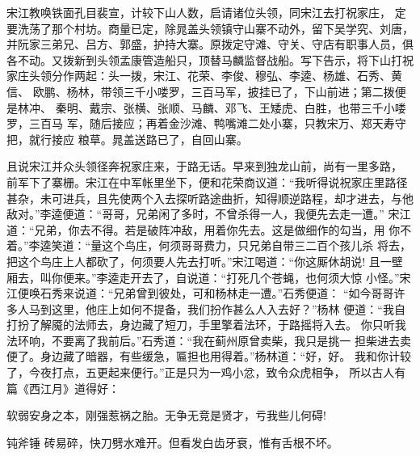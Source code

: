 宋江教唤铁面孔目裴宣，计较下山人数，启请诸位头领，同宋江去打祝家庄，
定要洗荡了那个村坊。商量已定，除晁盖头领镇守山寨不动外，留下吴学究、刘唐，
并阮家三弟兄、吕方、郭盛，护持大寨。原拨定守滩、守关、守店有职事人员，俱
各不动。又拨新到头领孟康管造船只，顶替马麟监督战船。写下告示，将下山打祝
家庄头领分作两起：头一拨，宋江、花荣、李俊、穆弘、李逵、杨雄、石秀、黄信、
欧鹏、杨林，带领三千小喽罗，三百马军，披挂已了，下山前进；第二拨便是林冲、
秦明、戴宗、张横、张顺、马麟、邓飞、王矮虎、白胜，也带三千小喽罗，三百马
军，随后接应；再着金沙滩、鸭嘴滩二处小寨，只教宋万、郑天寿守把，就行接应
粮草。晁盖送路已了，自回山寨。

且说宋江并众头领径奔祝家庄来，于路无话。早来到独龙山前，尚有一里多路，
前军下了寨栅。宋江在中军帐里坐下，便和花荣商议道：“我听得说祝家庄里路径
甚杂，未可进兵，且先使两个入去探听路途曲折，知得顺逆路程，却才进去，与他
敌对。”李逵便道：“哥哥，兄弟闲了多时，不曾杀得一人，我便先去走一遭。”
宋江道：“兄弟，你去不得。若是破阵冲敌，用着你先去。这是做细作的勾当，用
你不着。”李逵笑道：“量这个鸟庄，何须哥哥费力，只兄弟自带三二百个孩儿杀
将去，把这个鸟庄上人都砍了，何须要人先去打听。”宋江喝道：“你这厮休胡说!
且一壁厢去，叫你便来。”李逵走开去了，自说道：“打死几个苍蝇，也何须大惊
小怪。”宋江便唤石秀来说道：“兄弟曾到彼处，可和杨林走一遭。”石秀便道：
“如今哥哥许多人马到这里，他庄上如何不提备，我们扮作甚么人入去好？”杨林
便道：“我自打扮了解魇的法师去，身边藏了短刀，手里擎着法环，于路摇将入去。
你只听我法环响，不要离了我前后。”石秀道：“我在蓟州原曾卖柴，我只是挑一
担柴进去卖便了。身边藏了暗器，有些缓急，匾担也用得着。”杨林道：“好，好。
我和你计较了，今夜打点，五更起来便行。”正是只为一鸡小忿，致令众虎相争，
所以古人有篇《西江月》道得好：

软弱安身之本，刚强惹祸之胎。无争无竞是贤才，亏我些儿何碍!

钝斧锤
砖易碎，快刀劈水难开。但看发白齿牙衰，惟有舌根不坏。

